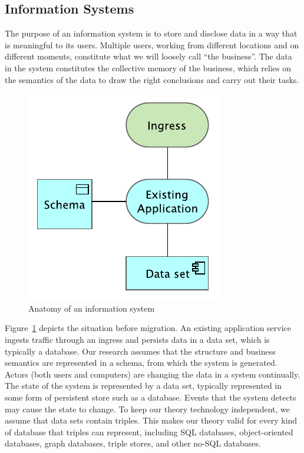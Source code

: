 \documentclass[runningheads]{llncs}
\begin{document}
\subsection{Information Systems}
   The purpose of an information system is to store and disclose data in a way that is meaningful to its users.
   Multiple users, working from different locations and on different moments, constitute what we will loosely call ``the business''.
   The data in the system constitutes the collective memory of the business,
   which relies on the semantics of the data to draw the right conclusions and carry out their tasks.
   \begin{figure}[bht]
      \begin{center}
        \includegraphics[scale=0.8]{figures/existing_system.pdf}
      \end{center}
   \caption{Anatomy of an information system}
   \label{fig:pre-migration}
   \end{figure}
   
   Figure~\ref{fig:pre-migration} depicts the situation before migration.
   An existing application service ingests traffic through an ingress and persists data in a data set, which is typically a database.
   Our research assumes that the structure and business semantics are represented in a schema, from which the system is generated.
   Actors (both users and computers) are changing the data in a system continually.
   The state of the system is represented by a data set, typically represented in some form of persistent store such as a database.
   Events that the system detects may cause the state to change.
   To keep our theory technology independent, we assume that data sets contain triples.
   This makes our theory valid for every kind of database that triples can represent,
   including SQL databases, object-oriented databases, graph databases, triple stores, and other no-SQL databases.
\end{document}
